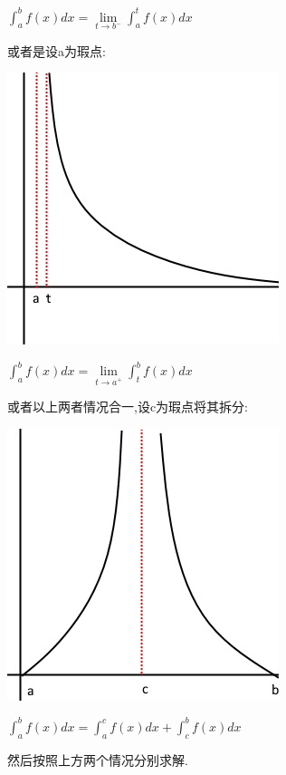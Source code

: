 \documentclass[UTF8,12pt]{ctexbook}
\newcommand{\limNormal}[1]{\lim\limits_{#1}}
\newcommand{\defFunction}[1]{f(#1)}
\newcommand{\definiteIntegral}[2]{\int^{#1}_{#2}}
\begin{document}
{{{{  $\definiteIntegral{b}{a}\defFunction{x}dx = \limNormal{t \to b^-}\definiteIntegral{t}{a}\defFunction{x}dx$

  或者是设a为瑕点:

  \begin{center}
    \includegraphics[scale=0.5]{resources/infityFunctionUnormalIntegral2.png}
  \end{center}

  $\definiteIntegral{b}{a}\defFunction{x}dx = \limNormal{t \to a^+}\definiteIntegral{b}{t}\defFunction{x}dx$

  或者以上两者情况合一,设c为瑕点将其拆分:

  \begin{center}
    \includegraphics{resources/infityFunctionUnormalIntegral3.png}
  \end{center}

  $\definiteIntegral{b}{a}\defFunction{x}dx = \definiteIntegral{c}{a}\defFunction{x}dx + \definiteIntegral{b}{c}\defFunction{x}dx$

  然后按照上方两个情况分别求解.

}}}}
\end{document}
